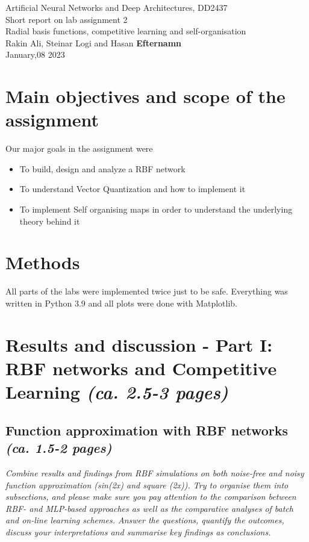 \documentclass[a4paper]{article}
\begin{document}
\begin{center}
  {\large Artificial Neural Networks and Deep Architectures, DD2437}\\
  \vspace{7mm}
  {\huge Short report on lab assignment 2\\[1ex]}
  {\Large Radial basis functions, competitive learning and self-organisation}\\
  \vspace{8mm}  
  {\Large Rakin Ali, Steinar Logi and Hasan \textbf{Efternamn}\\}
  \vspace{4mm}
  {\large January,08 2023\\}
\end{center}

\section{Main objectives and scope of the assignment}

Our major goals in the assignment were  
\begin{itemize}
\item To build, design and analyze a RBF network 
\item To understand Vector Quantization and how to implement it  
\item To implement Self organising maps in order to understand the underlying theory behind it
\end{itemize}

\section{Methods} All parts of the labs were implemented twice just to be safe. Everything was written in Python 3.9 and all plots were done with Matplotlib. 

\section{Results and discussion - Part I: RBF networks and Competitive Learning \normalsize{\textit{(ca. 2.5-3 pages)}}}


\subsection{Function approximation with RBF networks\\ \normalsize{\textit{(ca. 1.5-2 pages)}}}
\textit{Combine results and findings from RBF simulations on both noise-free and noisy function approximation (sin(2x) and square (2x)). Try to organise them into subsections, and please make sure you pay attention to the comparison between RBF- and MLP-based approaches as well as the comparative analyses of batch and on-line learning schemes. Answer the questions, quantify the outcomes, discuss your interpretations and summarise key findings as conclusions.}
\end{document}

